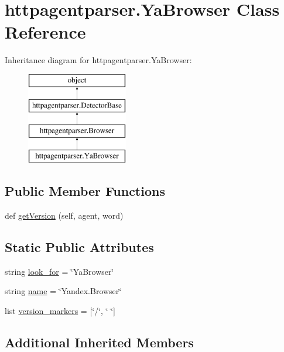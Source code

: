 \hypertarget{classhttpagentparser_1_1_ya_browser}{}\section{httpagentparser.\+Ya\+Browser Class Reference}
\label{classhttpagentparser_1_1_ya_browser}
Inheritance diagram for httpagentparser.\+Ya\+Browser\+:\begin{figure}[H]
\begin{center}
\leavevmode
\includegraphics[height=4.000000cm]{classhttpagentparser_1_1_ya_browser}
\end{center}
\end{figure}
\subsection*{Public Member Functions}
\begin{DoxyCompactItemize}
\item 
def \hyperlink{classhttpagentparser_1_1_ya_browser_a88154cb34c8119927c26d7635cd75a03}{get\+Version} (self, agent, word)
\end{DoxyCompactItemize}
\subsection*{Static Public Attributes}
\begin{DoxyCompactItemize}
\item 
string \hyperlink{classhttpagentparser_1_1_ya_browser_a5224da4f5a1b9a941c639aa343055b3a}{look\+\_\+for} = \char`\"{}Ya\+Browser\char`\"{}
\item 
string \hyperlink{classhttpagentparser_1_1_ya_browser_ad6c6da12eedb20c135fe1dd981cb57e5}{name} = \char`\"{}Yandex.\+Browser\char`\"{}
\item 
list \hyperlink{classhttpagentparser_1_1_ya_browser_a423bb45062f5d0f18ff4a246b82f1ea0}{version\+\_\+markers} = \mbox{[}\char`\"{}/\char`\"{}, \char`\"{} \char`\"{}\mbox{]}
\end{DoxyCompactItemize}
\subsection*{Additional Inherited Members}


